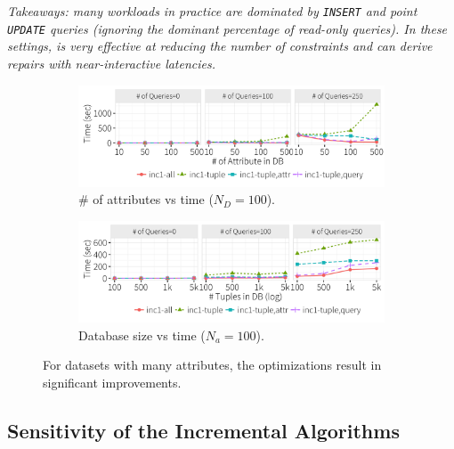 {\it Takeaways: many workloads in practice are dominated by \texttt{INSERT} and point \texttt{UPDATE} queries (ignoring the dominant percentage of read-only queries).  
In these settings, \sys is very effective at reducing the number of constraints and can derive repairs with near-interactive latencies.}

 \begin{figure}[!htb]
    \vspace*{-.1in}
    \centering
    \begin{subfigure}[t]{.49\textwidth}
    \includegraphics[width = .99\columnwidth]{figures/attr_time}
    \vspace*{-.1in}
    \caption{\# of attributes vs time ($N_D = 100$).}
    \label{f:attr} 
    \end{subfigure}
    \begin{subfigure}[t]{.49\textwidth}
    \includegraphics[width = .99\columnwidth]{figures/attr100_time}
    \vspace*{-.1in}
    \caption{Database size vs time ($N_a = 100$).}
    \label{f:attr100} 
    \end{subfigure}
    \vspace*{-.1in}
    \caption{For datasets with many attributes, the optimizations result in significant improvements.}
    \label{f:database}
  \end{figure}

\subsection{Sensitivity of the Incremental Algorithms}
\label{sec:experiments:inc}


